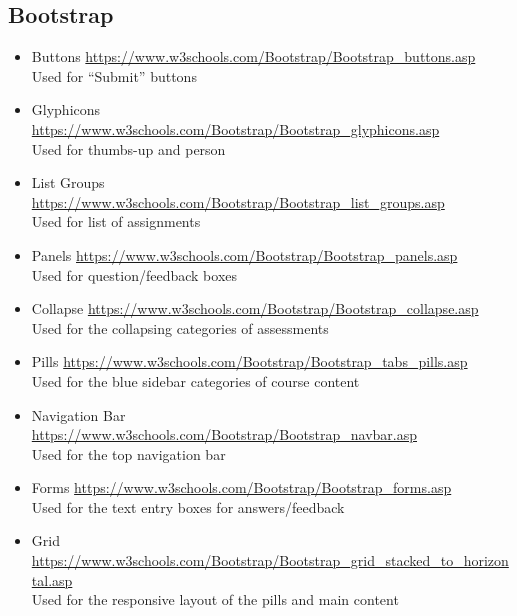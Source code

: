\documentclass[10pt,a4paper]{article}
\begin{document}
	\subsection*{Bootstrap}
	\begin{itemize}
		\item Buttons \url{https://www.w3schools.com/Bootstrap/Bootstrap_buttons.asp}\\Used for ``Submit'' buttons
		\item Glyphicons \url{https://www.w3schools.com/Bootstrap/Bootstrap_glyphicons.asp}\\Used for thumbs-up and person
		\item List Groups \url{https://www.w3schools.com/Bootstrap/Bootstrap_list_groups.asp}\\Used for list of assignments
		\item Panels \url{https://www.w3schools.com/Bootstrap/Bootstrap_panels.asp}\\Used for question/feedback boxes
		\item Collapse \url{https://www.w3schools.com/Bootstrap/Bootstrap_collapse.asp}\\Used for the collapsing categories of assessments
		\item Pills \url{https://www.w3schools.com/Bootstrap/Bootstrap_tabs_pills.asp}\\Used for the blue sidebar categories of course content
		\item Navigation Bar \url{https://www.w3schools.com/Bootstrap/Bootstrap_navbar.asp}\\Used for the top navigation bar
		\item Forms \url{https://www.w3schools.com/Bootstrap/Bootstrap_forms.asp}\\Used for the text entry boxes for answers/feedback
		\item Grid \url{https://www.w3schools.com/Bootstrap/Bootstrap_grid_stacked_to_horizontal.asp}\\	Used for the responsive layout of the pills and main content
	\end{itemize}
\end{document}
